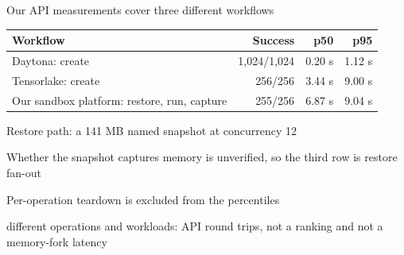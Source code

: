 \begin{frame}[t]{\ev{\tagM}Our API measurements cover three different workflows}
\vspace{.1cm}
{\small
\begin{tabularx}{\textwidth}{@{}Y r r r@{}}
\toprule
Workflow & Success & p50 & p95\\
\midrule
Daytona: create & 1,024/1,024 & 0.20 s & 1.12 s\\
Tensorlake: create & 256/256 & 3.44 s & 9.00 s\\
Our sandbox platform: restore, run, capture & 255/256 & 6.87 s & 9.04 s\\
\bottomrule
\end{tabularx}\par}
\vspace{.2cm}
{\small
\begin{ticks}
\item Restore path: a 141 MB named snapshot at concurrency 12
\item Whether the snapshot captures memory is unverified, so the third row is restore fan-out
\item Per-operation teardown is excluded from the percentiles
\item[\no] different operations and workloads: API round trips, not a ranking and not a memory-fork latency
\end{ticks}\par}
\end{frame}
